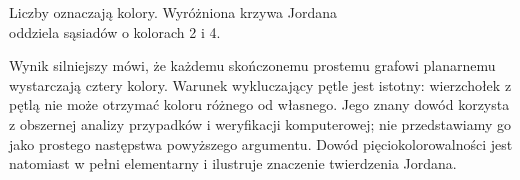 \begin{center}

\small Liczby oznaczają kolory. Wyróżniona krzywa Jordana\\
oddziela sąsiadów o kolorach 2 i 4.
\end{center}

\begin{uwaga}
Wynik silniejszy mówi, że każdemu skończonemu prostemu grafowi planarnemu
wystarczają cztery kolory. Warunek wykluczający pętle
jest istotny: wierzchołek z pętlą nie może otrzymać
koloru różnego od własnego. Jego znany dowód korzysta
z obszernej analizy przypadków i weryfikacji komputerowej;
nie przedstawiamy go jako prostego następstwa powyższego
argumentu. Dowód pięciokolorowalności jest natomiast
w pełni elementarny i ilustruje znaczenie twierdzenia Jordana.
\end{uwaga}


